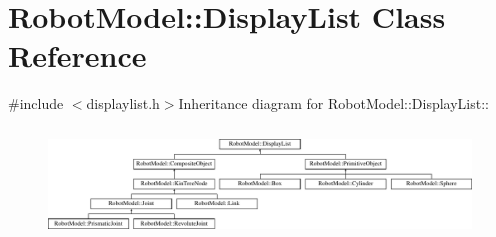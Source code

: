 \hypertarget{class_robot_model_1_1_display_list}{
\section{RobotModel::DisplayList Class Reference}
\label{class_robot_model_1_1_display_list}
}


{\ttfamily \#include $<$displaylist.h$>$}Inheritance diagram for RobotModel::DisplayList::\begin{figure}[H]
\begin{center}
\leavevmode
\includegraphics[height=2.97872cm]{class_robot_model_1_1_display_list}
\end{center}
\end{figure}
